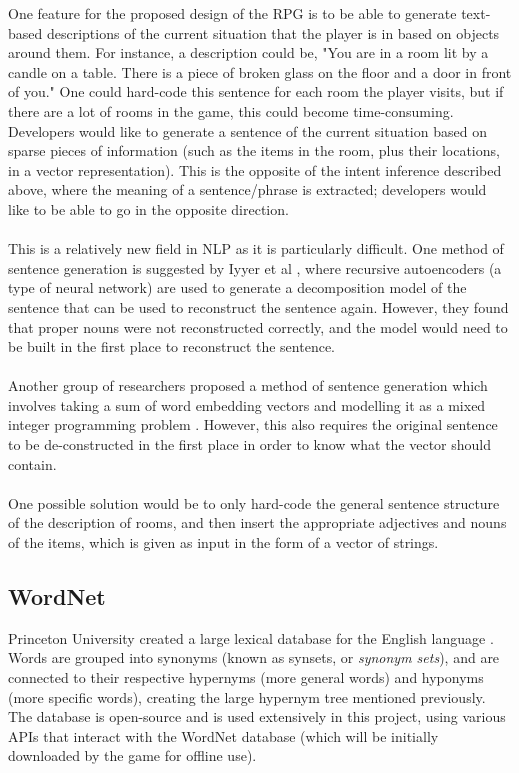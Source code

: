 \documentclass[11pt]{article}
\begin{document}
One feature for the proposed design of the RPG is to be able to generate text-based descriptions of the current situation that the player is in based on objects around them. For instance, a description could be, "You are in a room lit by a candle on a table. There is a piece of broken glass on the floor and a door in front of you." One could hard-code this sentence for each room the player visits, but if there are a lot of rooms in the game, this could become time-consuming. Developers would like to generate a sentence of the current situation based on sparse pieces of information (such as the items in the room, plus their locations, in a vector representation). This is the opposite of the intent inference described above, where the meaning of a sentence/phrase is extracted; developers would like to be able to go in the opposite direction.
\\
\\
This is a relatively new field in NLP as it is particularly difficult. One method of sentence generation is suggested by Iyyer et al \cite{RefWorks:55}, where recursive autoencoders (a type of neural network) are used to generate a decomposition model of the sentence that can be used to reconstruct the sentence again. However, they found that proper nouns were not reconstructed correctly, and the model would need to be built in the first place to reconstruct the sentence.
\\
\\
Another group of researchers proposed a method of sentence generation which involves taking a sum of word embedding vectors and modelling it as a mixed integer programming problem \cite{RefWorks:54}. However, this also requires the original sentence to be de-constructed in the first place in order to know what the vector should contain.
\\
\\
One possible solution would be to only hard-code the general sentence structure of the description of rooms, and then insert the appropriate adjectives and nouns of the items, which is given as input in the form of a vector of strings.

\subsection{WordNet}

Princeton University created a large lexical database for the English language \cite{RefWorks:20}. Words are grouped into synonyms (known as synsets, or \textit{synonym sets}), and are connected to their respective hypernyms (more general words) and hyponyms (more specific words), creating the large hypernym tree mentioned previously. The database is open-source and is used extensively in this project, using various APIs that interact with the WordNet database (which will be initially downloaded by the game for offline use).
\end{document}
